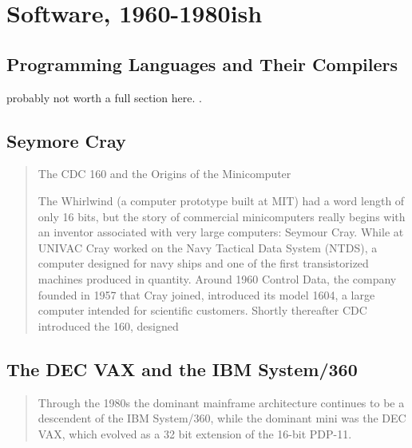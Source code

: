 
\chapter{Software, 1960-1980ish}
\label{chap:software}









\section{Programming Languages and Their Compilers}

probably not worth a full section here.
.

\section{Seymore Cray}
\begin{quotation}
	The CDC 160 and the Origins of the Minicomputer

	The Whirlwind (a computer prototype built at
	MIT) had a word length of only 16 bits, but the story of commercial minicomputers really begins with
	an inventor associated with very large computers: Seymour Cray. While at UNIVAC Cray worked on the
	Navy Tactical Data System (NTDS), a computer designed for navy ships and one of the first
	transistorized machines produced in quantity. Around 1960 Control Data, the company founded in 1957
	that Cray joined, introduced its model 1604, a large computer intended for scientific customers.
	Shortly thereafter CDC introduced the 160, designed
	\cite{nothing_new_since_von_neumann_2000}
\end{quotation}

\section{The DEC VAX and the IBM System/360}
\begin{quotation}
	Through the 1980s the dominant mainframe architecture continues to be a descendent of the IBM
	System/360, while the dominant mini was the DEC VAX, which evolved as a 32 bit extension of the
	16-bit PDP-11.
	\cite{nothing_new_since_von_neumann_2000}
\end{quotation}
